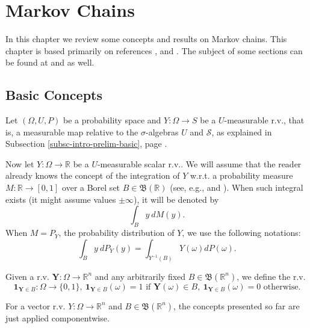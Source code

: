 \chapter{Markov Chains}\label{ch-mcmc}
\thispagestyle{headings}

In this chapter we review some concepts and results on Markov chains.
This chapter 
is based primarily on references \cite{Du05}, \cite{JaPr04} and \cite{So96}.
The subject of some sections can be found at \cite{KaSo05} and \cite{Ro96} as well.

\section{Basic Concepts}

Let $(\Omega,U,P)$ be a probability space and $Y:\Omega\rightarrow S$ be a $U$-measurable r.v.,
that is, a measurable map relative to the $\sigma$-algebras $U$ and $\mathcal{S}$,
as explained in Subsection \ref{subsc-intro-prelim-basic}, page \pageref{subsc-intro-prelim-basic}.

Now let $Y:\Omega\rightarrow\mathbb{R}$ be a $U$-measurable scalar r.v..
We will assume that the reader already knows the concept of the
integration of $Y$
w.r.t. a probability measure $M:\mathbb{R}\rightarrow [0,1]$
over a Borel set $B\in\mathfrak{B}(\mathbb{R})$ (see, e.g., \cite[Section A.4]{Du05} and \cite[Chapter 9]{JaPr04}).
When such integral exists (it might assume values $\pm\infty$), it will be denoted by
\begin{equation*}
\int_B y~dM(y).
\end{equation*}
When $M=P_Y$, the probability distribution of $Y$, we use the following notations:
\begin{equation*}
\int_B y~dP_Y(y) = 
\int_{Y^{-1}(B)}Y(\omega)dP(\omega).
\end{equation*}

Given a r.v. $\mathbf{Y}:\Omega\rightarrow\mathbb{R}^n$ and any arbitrarily fixed $B\in\mathfrak{B}(\mathbb{R}^n)$,
we define the r.v. 
\begin{equation*}
\mathbf{1}_{\mathbf{Y}\in B}:\Omega\rightarrow\{0,1\},
~\mathbf{1}_{\mathbf{Y}\in B}(\omega)=1\text{ if }\mathbf{Y}(\omega)\in B,
~\mathbf{1}_{\mathbf{Y}\in B}(\omega)=0\text{ otherwise}.
\end{equation*}

For a vector r.v. $Y:\Omega\rightarrow\mathbb{R}^n$ and $B\in\mathfrak{B}(\mathbb{R}^n)$,
the concepts presented so far are just applied componentwise.

